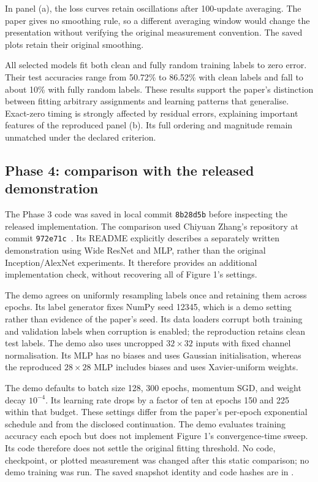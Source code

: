 \documentclass[11pt]{article}
\begin{document}
In panel (a), the loss curves retain oscillations after 100-update averaging. The paper gives no smoothing rule, so a different averaging window would change the presentation without verifying the original measurement convention. The saved plots retain their original smoothing.

All selected models fit both clean and fully random training labels to zero error. Their test accuracies range from 50.72\% to 86.52\% with clean labels and fall to about 10\% with fully random labels. These results support the paper's distinction between fitting arbitrary assignments and learning patterns that generalise. Exact-zero timing is strongly affected by residual errors, explaining important features of the reproduced panel (b). Its full ordering and magnitude remain unmatched under the declared criterion.

\subsection{Phase 4: comparison with the released demonstration}

The Phase 3 code was saved in local commit \texttt{8b28d5b} before inspecting the released implementation. The comparison used Chiyuan Zhang's repository at commit \texttt{972e71c}~\cite{author_demo}. Its README explicitly describes a separately written demonstration using Wide ResNet and MLP, rather than the original Inception/AlexNet experiments. It therefore provides an additional implementation check, without recovering all of Figure 1's settings.

The demo agrees on uniformly resampling labels once and retaining them across epochs. Its label generator fixes NumPy seed 12345, which is a demo setting rather than evidence of the paper's seed. Its data loaders corrupt both training and validation labels when corruption is enabled; the reproduction retains clean test labels. The demo also uses uncropped $32\times32$ inputs with fixed channel normalisation. Its MLP has no biases and uses Gaussian initialisation, whereas the reproduced $28\times28$ MLP includes biases and uses Xavier-uniform weights.

The demo defaults to batch size 128, 300 epochs, momentum SGD, and weight decay $10^{-4}$. Its learning rate drops by a factor of ten at epochs 150 and 225 within that budget. These settings differ from the paper's per-epoch exponential schedule and from the disclosed continuation. The demo evaluates training accuracy each epoch but does not implement Figure 1's convergence-time sweep. Its code therefore does not settle the original fitting threshold. No code, checkpoint, or plotted measurement was changed after this static comparison; no demo training was run. The saved snapshot identity and code hashes are in .
\end{document}

